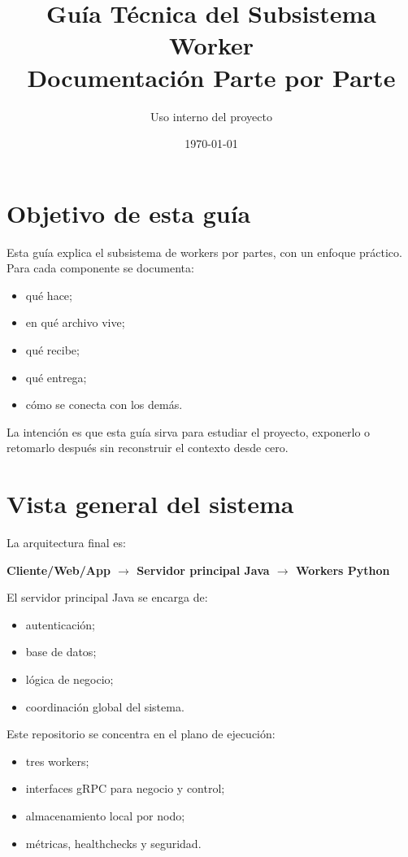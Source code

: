 \documentclass[11pt]{article}
\title{\textbf{Guía Técnica del Subsistema Worker}\\Documentación Parte por Parte}
\author{Uso interno del proyecto}
\date{\today}
\begin{document}
\maketitle
\tableofcontents
\newpage

\section{Objetivo de esta guía}
Esta guía explica el subsistema de workers por partes, con un enfoque práctico. Para cada componente se documenta:
\begin{itemize}
\item qué hace;
\item en qué archivo vive;
\item qué recibe;
\item qué entrega;
\item cómo se conecta con los demás.
\end{itemize}

La intención es que esta guía sirva para estudiar el proyecto, exponerlo o retomarlo después sin reconstruir el contexto desde cero.

\section{Vista general del sistema}
La arquitectura final es:

\begin{center}
\textbf{Cliente/Web/App $\rightarrow$ Servidor principal Java $\rightarrow$ Workers Python}
\end{center}

El servidor principal Java se encarga de:
\begin{itemize}
\item autenticación;
\item base de datos;
\item lógica de negocio;
\item coordinación global del sistema.
\end{itemize}

Este repositorio se concentra en el plano de ejecución:
\begin{itemize}
\item tres workers;
\item interfaces gRPC para negocio y control;
\item almacenamiento local por nodo;
\item métricas, healthchecks y seguridad.
\end{itemize}
\end{document}
